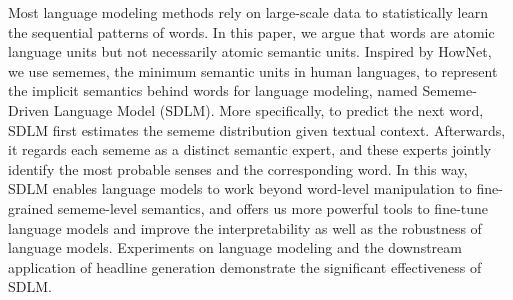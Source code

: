 Most language modeling methods rely on large-scale data to statistically learn the sequential patterns of words. In this paper, we argue that words are atomic language units but not necessarily atomic semantic units. Inspired by HowNet, we use sememes, the minimum semantic units in human languages, to represent the implicit semantics behind words for language modeling, named Sememe-Driven Language Model (SDLM). More specifically, to predict the next word, SDLM first estimates the sememe distribution given textual context. Afterwards, it regards each sememe as a distinct semantic expert, and these experts jointly identify the most probable senses and the corresponding word. In this way, SDLM enables language models to work beyond word-level manipulation to fine-grained sememe-level semantics, and offers us more powerful tools to fine-tune language models and improve the interpretability as well as the robustness of language models. Experiments on language modeling and the downstream application of headline generation demonstrate the significant effectiveness of SDLM.
